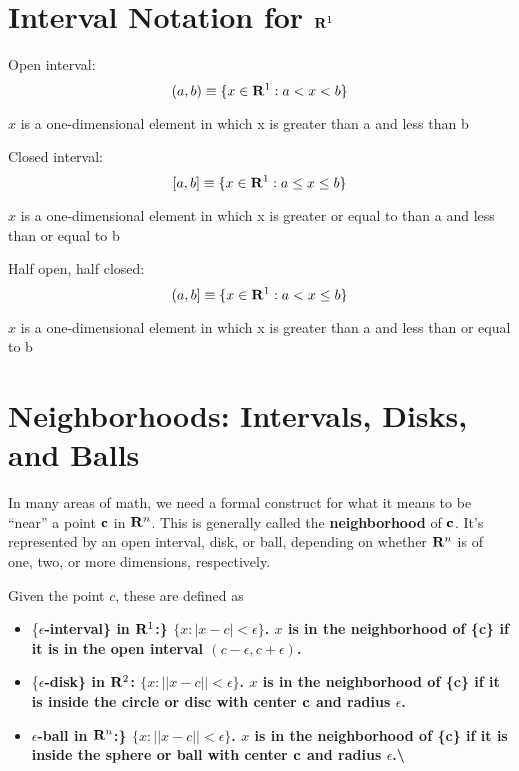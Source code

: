 \documentclass[]{book}
\providecommand{\tightlist}{%
  \setlength{\itemsep}{0pt}\setlength{\parskip}{0pt}}
\theoremstyle{definition}
\theoremstyle{definition}
\theoremstyle{definition}
\theoremstyle{remark}
\begin{document}
\section{\texorpdfstring{Interval Notation for
\({\bf R}^1\)}{Interval Notation for \{\textbackslash{}bf R\}\^{}1}}\label{interval-notation-for-bf-r1}

Open interval: \[(a,b)\equiv \{ x\in{\bf R}^1: a<x<b\}\]

\(x\) is a one-dimensional element in which x is greater than a and less
than b

Closed interval: \[[a,b]\equiv \{ x\in{\bf R}^1: a\le x \le b\}\]

\(x\) is a one-dimensional element in which x is greater or equal to
than a and less than or equal to b

Half open, half closed: \[(a,b]\equiv \{ x\in{\bf R}^1: a<x\le b\}\]

\(x\) is a one-dimensional element in which x is greater than a and less
than or equal to b

\section{Neighborhoods: Intervals, Disks, and
Balls}\label{neighborhoods-intervals-disks-and-balls}

In many areas of math, we need a formal construct for what it means to
be ``near'' a point \(\bf c\) in \({\bf R}^n\). This is generally called
the \textbf{neighborhood} of \(\bf c\). It's represented by an open
interval, disk, or ball, depending on whether \({\bf R}^n\) is of one,
two, or more dimensions, respectively.

Given the point \(c\), these are defined as

\begin{itemize}
\tightlist
\item
  \{\bf $\epsilon$-interval\} in \({\bf R}^1\):\}
  \(\{x : |x-c|<\epsilon \}\). \(x\) is in the neighborhood of \{\bf c\}
  if it is in the open interval \((c-\epsilon,c+\epsilon)\).
\item
  \{\bf $\epsilon$-disk\} in \({\bf R}^2\):
  \(\{x : || x-c ||<\epsilon\}\). \(x\) is in the neighborhood of
  \{\bf c\} if it is inside the circle or disc with center \(\bf c\) and
  radius \(\epsilon\).
\item
  \bf $\epsilon$-ball in ${\bf R}^n$:\} \(\{x : || x-c ||<\epsilon\}\).
  \(x\) is in the neighborhood of \{\bf c\} if it is inside the sphere
  or ball with center \(\bf c\) and radius \(\epsilon\).\textbackslash{}
\end{itemize}
\end{document}
